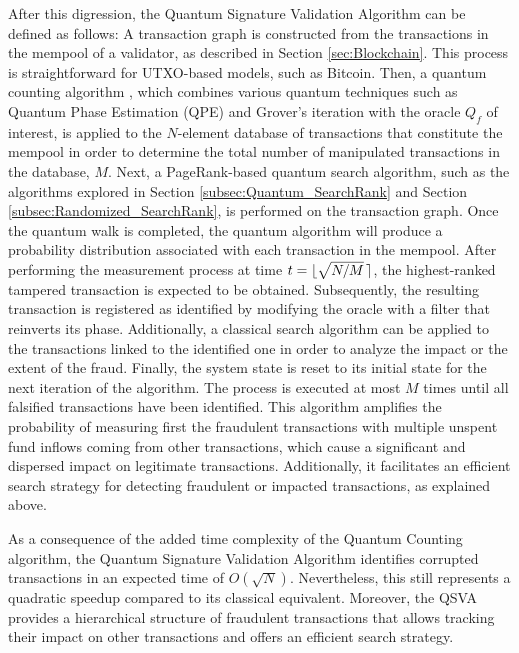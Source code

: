 \documentclass[nofootinbib,aps,prd,reprint,superscriptaddress,floatfix]{revtex4-2}
\begin{document}
After this digression, the Quantum Signature Validation Algorithm can be defined as follows:
A transaction graph is constructed from the transactions in the mempool of a validator, as described in Section \ref{sec:Blockchain}. This process is straightforward for UTXO-based models, such as Bitcoin. Then, a quantum counting algorithm \cite{Q_counting_1,Q_counting_2}, which combines various quantum techniques such as Quantum Phase Estimation (QPE) and Grover's iteration with the oracle $Q_f$ of interest, is applied to the $N$-element database of transactions that constitute the mempool in order to determine the total number of manipulated transactions in the database, $M$. Next, a PageRank-based quantum search algorithm, such as the algorithms explored in Section \ref{subsec:Quantum_SearchRank} and Section \ref{subsec:Randomized_SearchRank}, is performed on the transaction graph. Once the quantum walk is completed, the quantum algorithm will produce a probability distribution associated with each transaction in the mempool. After performing the measurement process at time $t=\lfloor\sqrt{N/M} \hspace{1.5pt}\rceil$, the highest-ranked tampered transaction is expected to be obtained. Subsequently, the resulting transaction is registered as identified by modifying the oracle with a filter that reinverts its phase. Additionally, a classical search algorithm can be applied to the transactions linked to the identified one in order to analyze the impact or the extent of the fraud. Finally, the system state is reset to its initial state for the next iteration of the algorithm. The process is executed at most $M$ times until all falsified transactions have been identified. This algorithm amplifies the probability of measuring first the fraudulent transactions with multiple unspent fund inflows coming from other transactions, which cause a significant and dispersed impact on legitimate transactions. Additionally, it facilitates an efficient search strategy for detecting fraudulent or impacted transactions, as explained above.

As a consequence of the added time complexity of the Quantum Counting algorithm, the Quantum Signature Validation Algorithm identifies corrupted transactions in an expected time of $O(\sqrt{N})$. Nevertheless, this still represents a quadratic speedup compared to its classical equivalent. Moreover, the QSVA provides a hierarchical structure of fraudulent transactions that allows tracking their impact on other transactions and offers an efficient search strategy.
\end{document}
